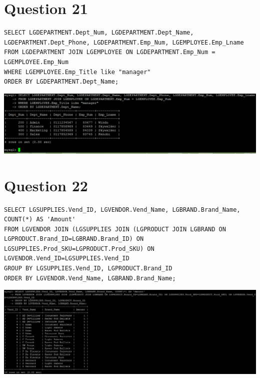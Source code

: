 \documentclass[a4paper,10pt]{article}
\begin{document}
\section*{Question 21}
\lstset{
            language=SQL,
            breaklines=true
            }
        \begin{lstlisting}[frame=single]
        SELECT LGDEPARTMENT.Dept_Num, LGDEPARTMENT.Dept_Name, LGDEPARTMENT.Dept_Phone, LGDEPARTMENT.Emp_Num, LGEMPLOYEE.Emp_Lname
FROM LGDEPARTMENT JOIN LGEMPLOYEE ON LGDEPARTMENT.Emp_Num = LGEMPLOYEE.Emp_Num
WHERE LGEMPLOYEE.Emp_Title like "manager"
ORDER BY LGDEPARTMENT.Dept_Name;

        \end{lstlisting}
\includegraphics{Queries/Question_21/Question_21_screenshot.PNG}
\section*{Question 22}
\lstset{
            language=SQL,
            breaklines=true
            }
        \begin{lstlisting}[frame=single]
        SELECT LGSUPPLIES.Vend_ID, LGVENDOR.Vend_Name, LGBRAND.Brand_Name, COUNT(*) AS 'Amount'
FROM LGVENDOR JOIN (LGSUPPLIES JOIN (LGPRODUCT JOIN LGBRAND ON LGPRODUCT.Brand_ID=LGBRAND.Brand_ID) ON LGSUPPLIES.Prod_SKU=LGPRODUCT.Prod_SKU) ON LGVENDOR.Vend_ID=LGSUPPLIES.Vend_ID
GROUP BY LGSUPPLIES.Vend_ID, LGPRODUCT.Brand_ID
ORDER BY LGVENDOR.Vend_Name, LGBRAND.Brand_Name;
        \end{lstlisting}
\includegraphics{Queries/Question_22/Q22_screenshot.jpg}
\end{document}
